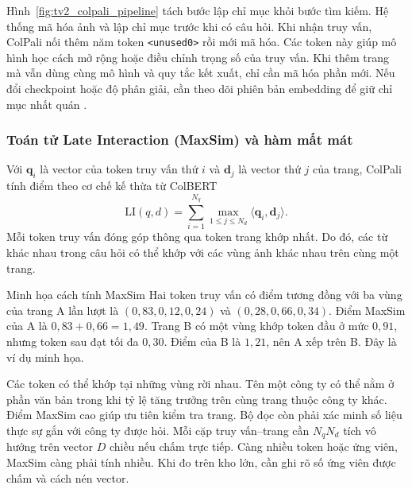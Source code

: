 Hình~\ref{fig:tv2_colpali_pipeline} tách bước lập chỉ mục khỏi bước
tìm kiếm. Hệ thống mã hóa ảnh và lập chỉ mục trước khi có câu hỏi.
Khi nhận truy vấn, ColPali nối thêm năm token \texttt{<unused0>} rồi
mới mã hóa. Các token này giúp mô hình học cách mở rộng hoặc điều
chỉnh trọng số của truy vấn. Khi thêm trang mà vẫn dùng cùng mô hình
và quy tắc kết xuất, chỉ cần mã hóa phần mới. Nếu đổi checkpoint hoặc
độ phân giải, cần theo dõi phiên bản embedding để giữ chỉ mục nhất
quán \cite{faysse2025colpali,khattab2020colbert}.

\subsubsection{Toán tử Late Interaction (MaxSim) và hàm mất mát}

Với $\mathbf{q}_i$ là vector của token truy vấn thứ $i$ và $\mathbf{d}_j$
là vector thứ $j$ của trang, ColPali tính điểm theo cơ chế kế thừa từ
ColBERT \cite{khattab2020colbert,faysse2025colpali}
\begin{equation}
    \mathrm{LI}(q,d)
    = \sum_{i=1}^{N_q}\max_{1\le j\le N_d}
        \langle \mathbf{q}_i,\mathbf{d}_j\rangle.
\end{equation}
Mỗi token truy vấn đóng góp thông qua token trang khớp nhất. Do đó,
các từ khác nhau trong câu hỏi có thể khớp với các vùng ảnh khác nhau
trên cùng một trang.


\begin{examplebox}{Minh họa cách tính MaxSim}
Hai token truy vấn có điểm tương đồng với ba vùng của trang A lần lượt
là $(0{,}83,0{,}12,0{,}24)$ và $(0{,}28,0{,}66,0{,}34)$.
Điểm MaxSim của A là $0{,}83+0{,}66=1{,}49$. Trang B có một vùng
khớp token đầu ở mức $0{,}91$, nhưng token sau đạt tối đa $0{,}30$.
Điểm của B là $1{,}21$, nên A xếp trên B. Đây là ví dụ minh họa.
\end{examplebox}

Các token có thể khớp tại những vùng rời nhau. Tên một công ty có
thể nằm ở phần văn bản trong khi tỷ lệ tăng trưởng trên cùng trang
thuộc công ty khác. Điểm MaxSim cao giúp ưu tiên kiểm tra trang.
Bộ đọc còn phải xác minh số liệu thực sự gắn với công ty được hỏi.
Mỗi cặp truy vấn--trang cần $N_qN_d$ tích vô hướng trên vector $D$
chiều nếu chấm trực tiếp. Càng nhiều token hoặc ứng viên, MaxSim
càng phải tính nhiều. Khi đo trên kho lớn, cần ghi rõ số ứng viên
được chấm và cách nén vector.

